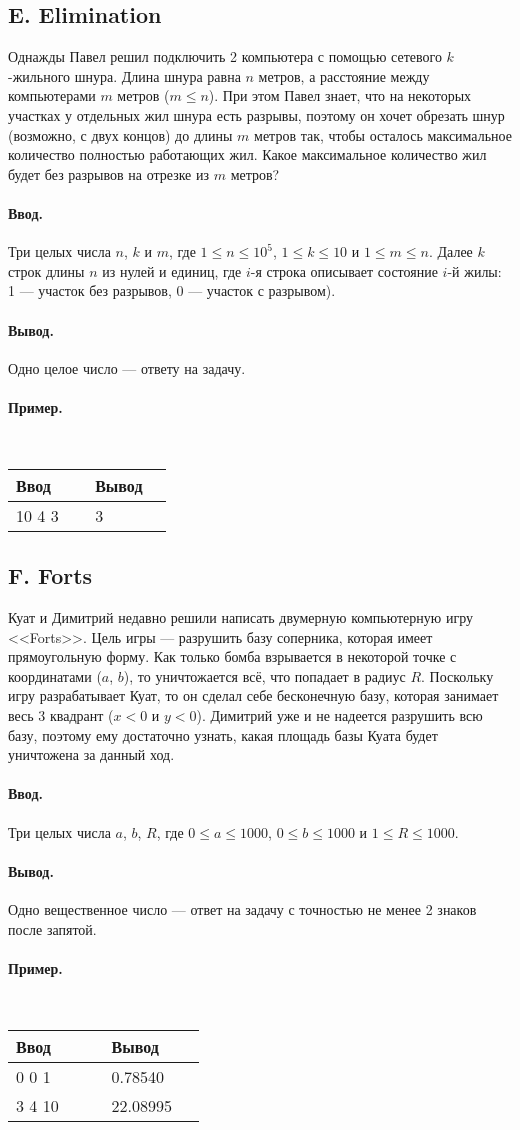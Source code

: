 \documentclass[12pt, a4paper]{article}
\newcommand{\informat}[1]
{
	\paragraph{Ввод.\\} #1
}
\newcommand{\outformat}[1]
{
	\paragraph{Вывод.\\} #1
}
\newcommand{\example}[2]
{
	\paragraph{Пример.\\}
	{\tt
	\begin{tabular}{|p{0.4\linewidth}|p{0.4\linewidth}|}
	\hline
	Ввод & Вывод \\
	\hline
	#1 & #2		\\
	\hline
	\end{tabular}
	}
}
\newcommand{\examplee}[4]
{
	\paragraph{Пример.\\}
	{\tt
	\begin{tabular}{|p{0.4\linewidth}|p{0.4\linewidth}|}
	\hline
	Ввод 	& Вывод  	\\
	\hline
	#1 		& #2 		\\
	\hline
	#3		& #4		\\
	\hline
	\end{tabular}
	}
}
\begin{document}
\subsection*{E. Elimination}

Однажды Павел решил подключить 2 компьютера с помощью сетевого $k$-жильного шнура. Длина шнура равна $n$ метров, а расстояние между компьютерами $m$ метров ($m \leqslant n$). При этом Павел знает, что на некоторых участках у отдельных жил шнура есть разрывы, поэтому он хочет обрезать шнур (возможно, с двух концов) до длины $m$ метров так, чтобы осталось максимальное количество полностью работающих жил. Какое максимальное количество жил будет без разрывов на отрезке из $m$ метров?

\informat{Три целых числа $n$, $k$ и $m$, где $1 \leqslant n \leqslant 10^5$,  $1 \leqslant k \leqslant 10$ и $1 \leqslant m \leqslant n$. \newline
Далее $k$ строк длины $n$ из нулей и единиц, где $i$-я строка описывает состояние $i$-й жилы: 1 --- участок без разрывов, 0 --- участок с разрывом).
}

\outformat{Одно целое число --- ответу на задачу.}

\example{
10 4 3 \newline
1110111111 \newline
1011111111 \newline
0011111100 \newline
1111110111}
{3}



\subsection*{F. Forts}

Куат и Димитрий недавно решили написать двумерную компьютерную игру <<Forts>>. Цель игры --- разрушить базу соперника, которая имеет прямоугольную форму. Как только бомба взрывается в некоторой точке с координатами ($a$, $b$), то уничтожается всё, что попадает в радиус $R$. Поскольку игру разрабатывает Куат, то он сделал себе бесконечную базу, которая занимает весь 3 квадрант ($x < 0$ и $y < 0$). Димитрий уже и не надеется разрушить всю базу, поэтому ему достаточно узнать, какая площадь базы Куата будет уничтожена за данный ход.

\informat{Три целых числа $a$, $b$, $R$, где $0 \le a \le 1000$, $0 \le b \le 1000$ и $1 \le R \le 1000$.}

\outformat{Одно вещественное число --- ответ на задачу с точностью не менее 2 знаков после запятой.}

\examplee{0 0 1}{0.78540}{3 4 10}{22.08995}
\end{document}
